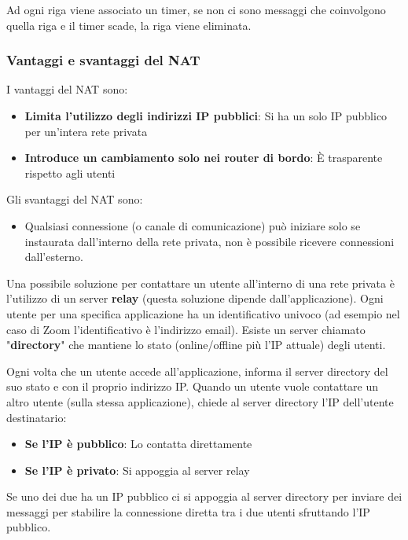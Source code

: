 \documentclass[a4paper]{article}
\begin{document}
\vspace{1em}
\noindent
Ad ogni riga viene associato un timer, se non ci sono messaggi che coinvolgono quella riga
e il timer scade, la riga viene eliminata.

\subsubsection{Vantaggi e svantaggi del NAT}
I vantaggi del NAT sono:
\begin{itemize}
  \item \textbf{Limita l'utilizzo degli indirizzi IP pubblici}: Si ha un solo IP pubblico
    per un'intera rete privata

  \item \textbf{Introduce un cambiamento solo nei router di bordo}: È trasparente rispetto agli
    utenti
\end{itemize}

\noindent
Gli svantaggi del NAT sono:
\begin{itemize}
  \item Qualsiasi connessione (o canale di comunicazione) può iniziare solo se instaurata
    dall'interno della rete privata, non è possibile ricevere connessioni dall'esterno.
\end{itemize}

\noindent
Una possibile soluzione per contattare un utente all'interno di una rete privata è
l'utilizzo di un server \textbf{relay} (questa soluzione dipende dall'applicazione).
Ogni utente per una specifica applicazione ha un identificativo univoco (ad esempio
nel caso di Zoom l'identificativo è l'indirizzo email). Esiste un server chiamato
"\textbf{directory}" che mantiene lo stato (online/offline più l'IP attuale) degli utenti.

\noindent
Ogni volta che un utente accede all'applicazione, informa il server directory del suo
stato e con il proprio indirizzo IP. Quando un utente vuole contattare un altro utente
(sulla stessa applicazione), chiede al server directory l'IP dell'utente destinatario:
\begin{itemize}
  \item \textbf{Se l'IP è pubblico}: Lo contatta direttamente
  \item \textbf{Se l'IP è privato}: Si appoggia al server relay
\end{itemize}
\label{28-11-D1}
\noindent
Se uno dei due ha un IP pubblico ci si appoggia al server directory per inviare dei
messaggi per stabilire la connessione diretta tra i due utenti sfruttando l'IP pubblico.
\end{document}

